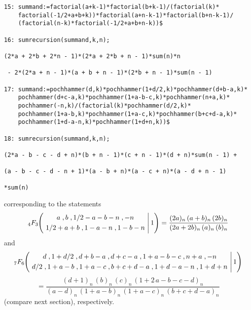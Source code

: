 {\small
\begin{verbatim}
15: summand:=factorial(a+k-1)*factorial(b+k-1)/(factorial(k)*
    factorial(-1/2+a+b+k))*factorial(a+n-k-1)*factorial(b+n-k-1)/
    (factorial(n-k)*factorial(-1/2+a+b+n-k))$

16: sumrecursion(summand,k,n);

(2*a + 2*b + 2*n - 1)*(2*a + 2*b + n - 1)*sum(n)*n

 - 2*(2*a + n - 1)*(a + b + n - 1)*(2*b + n - 1)*sum(n - 1)

17: summand:=pochhammer(d,k)*pochhammer(1+d/2,k)*pochhammer(d+b-a,k)*
    pochhammer(d+c-a,k)*pochhammer(1+a-b-c,k)*pochhammer(n+a,k)*
    pochhammer(-n,k)/(factorial(k)*pochhammer(d/2,k)*
    pochhammer(1+a-b,k)*pochhammer(1+a-c,k)*pochhammer(b+c+d-a,k)*
    pochhammer(1+d-a-n,k)*pochhammer(1+d+n,k))$

18: sumrecursion(summand,k,n);

(2*a - b - c - d + n)*(b + n - 1)*(c + n - 1)*(d + n)*sum(n - 1) +

(a - b - c - d - n + 1)*(a - b + n)*(a - c + n)*(a - d + n - 1)

*sum(n)
\end{verbatim}
}\noindent
corresponding to the statements
\[
_4 F_3\left.
\!\!
\left(
\!\!\!\!
\begin{array}{c}
\multicolumn{1}{c}{\begin{array}{c}
a\;, b\;, 1/2-a-b-n\;, -n
\end{array}}\\[1mm]
\multicolumn{1}{c}{\begin{array}{c}
1/2+a+b \;, 1-a-n\;, 1-b-n
            \end{array}}\end{array}
\!\!\!\!
\right| 1\right)
=\frac{(2a)_n\,(a+b)_n\,(2b)_n}
{(2a+2b)_n\,(a)_n\,(b)_n}
\]
and
\[
_7 F_6\left.
\!\!
\left(
\!\!\!\!
\begin{array}{c}
\multicolumn{1}{c}{\begin{array}{c}
d\;, 1+d/2\;, d+b-a\;, d+c-a\;, 1+a-b-c\;, n+a\;, -n
\end{array}}\\[1mm]
\multicolumn{1}{c}{\begin{array}{c}
 d/2\;, 1+a-b\;, 1+a-c\;, b+c+d-a \;, 1+d-a-n\;, 1+d+n
            \end{array}}\end{array}
\!\!\!\!
\right| 1\right)
\]
\[
=\frac{(d+1)_n\,(b)_n\,(c)_n\,(1+2\,a-b-c-d)_n}
{(a-d)_n\,(1+a-b)_n\,(1+a-c)_n\,(b+c+d-a)_n}
\]
(compare next section), respectively.

